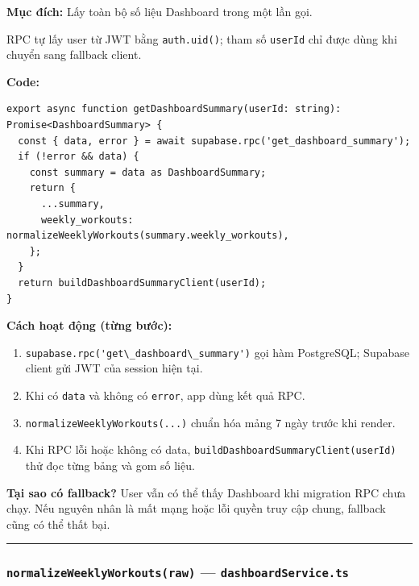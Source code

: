 \documentclass[12pt,a4paper]{article}
\providecommand{\passthrough}[1]{#1}
\providecommand{\tightlist}{%
  \setlength{\itemsep}{0pt}\setlength{\parskip}{0pt}}
\begin{document}
\textbf{Mục đích:} Lấy toàn bộ số liệu Dashboard trong một lần gọi.

RPC tự lấy user từ JWT bằng \passthrough{\lstinline!auth.uid()!}; tham
số \passthrough{\lstinline!userId!} chỉ được dùng khi chuyển sang
fallback client.

\textbf{Code:}

\begin{lstlisting}
export async function getDashboardSummary(userId: string): Promise<DashboardSummary> {
  const { data, error } = await supabase.rpc('get_dashboard_summary');
  if (!error && data) {
    const summary = data as DashboardSummary;
    return {
      ...summary,
      weekly_workouts: normalizeWeeklyWorkouts(summary.weekly_workouts),
    };
  }
  return buildDashboardSummaryClient(userId);
}

\end{lstlisting}

\textbf{Cách hoạt động (từng bước):}

\begin{enumerate}
\def\labelenumi{\arabic{enumi}.}
\tightlist
\item
  \passthrough{\lstinline!supabase.rpc('get\_dashboard\_summary')!} gọi
  hàm PostgreSQL; Supabase client gửi JWT của session hiện tại.
\item
  Khi có \passthrough{\lstinline!data!} và không có
  \passthrough{\lstinline!error!}, app dùng kết quả RPC.
\item
  \passthrough{\lstinline!normalizeWeeklyWorkouts(...)!} chuẩn hóa mảng
  7 ngày trước khi render.
\item
  Khi RPC lỗi hoặc không có data,
  \passthrough{\lstinline!buildDashboardSummaryClient(userId)!} thử đọc
  từng bảng và gom số liệu.
\end{enumerate}

\textbf{Tại sao có fallback?} User vẫn có thể thấy Dashboard khi
migration RPC chưa chạy. Nếu nguyên nhân là mất mạng hoặc lỗi quyền truy
cập chung, fallback cũng có thể thất bại.

\begin{center}\rule{0.5\linewidth}{0.5pt}\end{center}

\subsubsection{\texorpdfstring{\texttt{normalizeWeeklyWorkouts(raw)} ---
\texttt{dashboardService.ts}}{normalizeWeeklyWorkouts(raw) --- dashboardService.ts}}\label{normalizeweeklyworkoutsraw-dashboardservice.ts}
\end{document}
